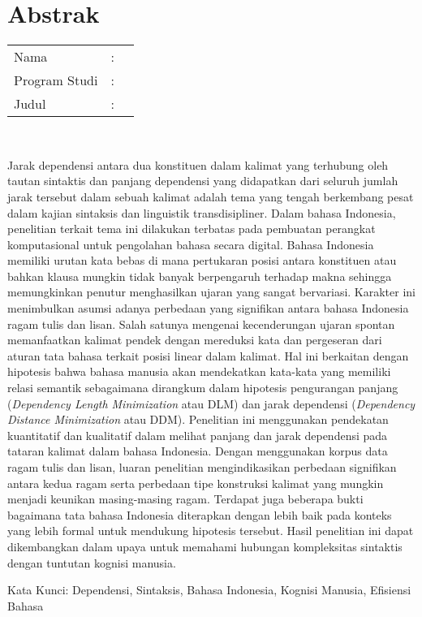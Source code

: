 %
%
%

\chapter*{Abstrak}

\vspace*{0.2cm}

\noindent \begin{tabular}{l l p{10cm}}
	Nama&: & \penulis \\
	Program Studi&: & \program \\
	Judul&: & \judul \\
\end{tabular} \\ 

\vspace*{1cm}

Jarak dependensi antara dua konstituen dalam kalimat yang terhubung oleh tautan sintaktis dan panjang dependensi yang didapatkan dari seluruh jumlah jarak tersebut dalam sebuah kalimat adalah tema yang tengah berkembang pesat dalam kajian sintaksis dan linguistik transdisipliner. Dalam bahasa Indonesia, penelitian terkait tema ini dilakukan terbatas pada pembuatan perangkat komputasional untuk pengolahan bahasa secara digital. Bahasa Indonesia memiliki urutan kata bebas di mana pertukaran posisi antara konstituen atau bahkan klausa mungkin tidak banyak berpengaruh terhadap makna sehingga memungkinkan penutur menghasilkan ujaran yang sangat bervariasi. Karakter ini menimbulkan asumsi adanya perbedaan yang signifikan antara bahasa Indonesia ragam tulis dan lisan. Salah satunya mengenai kecenderungan ujaran spontan memanfaatkan kalimat pendek dengan mereduksi kata dan pergeseran dari aturan tata bahasa terkait posisi linear dalam kalimat. Hal ini berkaitan dengan hipotesis bahwa bahasa manusia akan mendekatkan kata-kata yang memiliki relasi semantik sebagaimana dirangkum dalam hipotesis pengurangan panjang (\textit{Dependency Length Minimization} atau DLM) dan jarak dependensi (\textit{Dependency Distance Minimization} atau DDM). Penelitian ini menggunakan pendekatan kuantitatif dan kualitatif dalam melihat panjang dan jarak dependensi pada tataran kalimat dalam bahasa Indonesia. Dengan menggunakan korpus data ragam tulis dan lisan, luaran penelitian mengindikasikan perbedaan signifikan antara kedua ragam serta perbedaan tipe konstruksi kalimat yang mungkin menjadi keunikan masing-masing ragam. Terdapat juga beberapa bukti bagaimana tata bahasa Indonesia diterapkan dengan lebih baik pada konteks yang lebih formal untuk mendukung hipotesis tersebut. Hasil penelitian ini dapat dikembangkan dalam upaya untuk memahami hubungan kompleksitas sintaktis dengan tuntutan kognisi manusia.

\vspace*{0.5cm}

\noindent Kata Kunci: 
\newline
\noindent Dependensi, Sintaksis, Bahasa Indonesia, Kognisi Manusia, Efisiensi Bahasa

\newpage